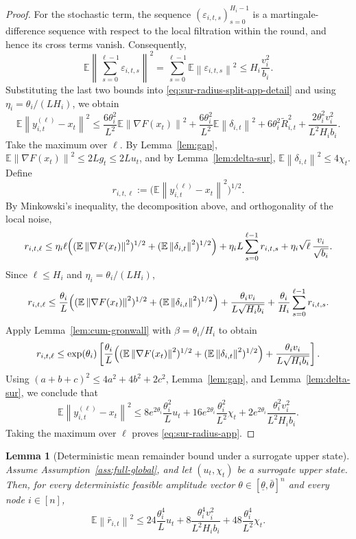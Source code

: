 \documentclass{article}
\newtheorem{lemma}[theorem]{Lemma}
\theoremstyle{definition}
\newcommand{\EE}{\mathbb E}
\newcommand{\norm}[1]{\left\lVert #1\right\rVert}
\begin{document}
\begin{proof}
For the stochastic term, the sequence
$(\varepsilon_{i,t,s})_{s=0}^{H_i-1}$ is a martingale-difference sequence with
respect to the local filtration within the round, and hence its cross terms
vanish. Consequently,
\[
\EE\left\|\sum_{s=0}^{\ell-1}\varepsilon_{i,t,s}\right\|^2
=
\sum_{s=0}^{\ell-1}\EE\norm{\varepsilon_{i,t,s}}^2
\le
H_i\frac{v_i^2}{b_i}.
\]
Substituting the last two bounds into
\eqref{eq:sur-radius-split-app-detail} and using
$\eta_i=\theta_i/(L H_i)$, we obtain
\[
\EE\norm{y_{i,t}^{(\ell)}-x_t}^2
\le
\frac{6\theta_i^2}{L^2}\EE\norm{\nabla F(x_t)}^2
+
\frac{6\theta_i^2}{L^2}\EE\norm{\delta_{i,t}}^2
+
6\theta_i^2\widetilde R_{i,t}^2
+
\frac{2\theta_i^2v_i^2}{L^2 H_i b_i}.
\]
Take the maximum over $\ell$. By Lemma~\ref{lem:gap}, $
\EE\norm{\nabla F(x_t)}^2\le 2L g_t\le 2L u_t$,
and by Lemma~\ref{lem:delta-sur}, $
\EE\norm{\delta_{i,t}}^2\le 4\chi_t$.
Define
\[
r_{i,t,\ell}:=\bigl(\EE\norm{y_{i,t}^{(\ell)}-x_t}^2\bigr)^{1/2}.
\]
By Minkowski's inequality, the decomposition above, and orthogonality of the local noise,
\[
r_{i,t,\ell}
\le
\eta_i\ell\Bigl((\EE\norm{\nabla F(x_t)}^2)^{1/2}+(\EE\norm{\delta_{i,t}}^2)^{1/2}\Bigr)
+
\eta_i L\sum_{s=0}^{\ell-1} r_{i,t,s}
+
\eta_i\sqrt{\ell}\,\frac{v_i}{\sqrt{b_i}}.
\]
Since $\ell\le H_i$ and $\eta_i=\theta_i/(L H_i)$,
\[
r_{i,t,\ell}
\le
\frac{\theta_i}{L}\Bigl((\EE\norm{\nabla F(x_t)}^2)^{1/2}+(\EE\norm{\delta_{i,t}}^2)^{1/2}\Bigr)
+
\frac{\theta_i v_i}{L\sqrt{H_i b_i}}
+
\frac{\theta_i}{H_i}\sum_{s=0}^{\ell-1} r_{i,t,s}.
\]
Apply Lemma~\ref{lem:cum-gronwall} with $\beta=\theta_i/H_i$ to obtain
\[
r_{i,t,\ell}
\le
\exp(\theta_i)\left[
\frac{\theta_i}{L}\Bigl((\EE\norm{\nabla F(x_t)}^2)^{1/2}+(\EE\norm{\delta_{i,t}}^2)^{1/2}\Bigr)
+
\frac{\theta_i v_i}{L\sqrt{H_i b_i}}
\right].
\]
Using $(a+b+c)^2\le 4a^2+4b^2+2c^2$, Lemma~\ref{lem:gap}, and Lemma~\ref{lem:delta-sur}, we conclude that
\[
\EE\norm{y_{i,t}^{(\ell)}-x_t}^2
\le
8 e^{2\theta_i}\frac{\theta_i^2}{L}u_t
+
16 e^{2\theta_i}\frac{\theta_i^2}{L^2}\chi_t
+
2 e^{2\theta_i}\frac{\theta_i^2v_i^2}{L^2 H_i b_i}.
\]
Taking the maximum over $\ell$ proves \eqref{eq:sur-radius-app}.
\end{proof}

\begin{lemma}[Deterministic mean remainder bound under a surrogate upper state]
\label{lem:sur-rbar}
Assume Assumption~\ref{ass:full-global}, and let $(u_t,\chi_t)$ be a surrogate
upper state. Then, for every deterministic feasible amplitude vector
$\theta\in[\underline\theta,\bar\theta]^n$ and every node $i\in[n]$,
\[
\EE\norm{\bar r_{i,t}}^2
\le
24\frac{\theta_i^4}{L}u_t
+
8\frac{\theta_i^4 v_i^2}{L^2 H_i b_i}
+
48\frac{\theta_i^4}{L^2}\chi_t.
\]
\end{lemma}
\end{document}
